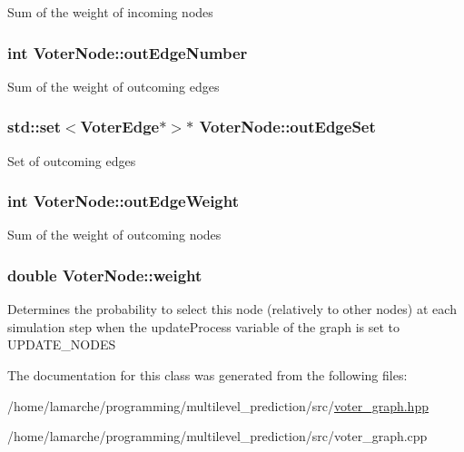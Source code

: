Sum of the weight of incoming nodes \hypertarget{class_voter_node_ad02a5823353dd4f1e0a1b9965553a1ef}{
\subsubsection[{out\-Edge\-Number}]{\setlength{\rightskip}{0pt plus 5cm}int Voter\-Node\-::out\-Edge\-Number}}\label{class_voter_node_ad02a5823353dd4f1e0a1b9965553a1ef}
Sum of the weight of outcoming edges \hypertarget{class_voter_node_abbeb36b008f12217d080f9eb287ae9de}{
\subsubsection[{out\-Edge\-Set}]{\setlength{\rightskip}{0pt plus 5cm}std\-::set$<${\bf Voter\-Edge}$\ast$$>$$\ast$ Voter\-Node\-::out\-Edge\-Set}}\label{class_voter_node_abbeb36b008f12217d080f9eb287ae9de}
Set of outcoming edges \hypertarget{class_voter_node_ae092216c9048f14155b2e580236ab6a9}{
\subsubsection[{out\-Edge\-Weight}]{\setlength{\rightskip}{0pt plus 5cm}int Voter\-Node\-::out\-Edge\-Weight}}\label{class_voter_node_ae092216c9048f14155b2e580236ab6a9}
Sum of the weight of outcoming nodes \hypertarget{class_voter_node_a06aa43e2603a2c8ee7540c754ef1fce2}{
\subsubsection[{weight}]{\setlength{\rightskip}{0pt plus 5cm}double Voter\-Node\-::weight}}\label{class_voter_node_a06aa43e2603a2c8ee7540c754ef1fce2}
Determines the probability to select this node (relatively to other nodes) at each simulation step when the update\-Process variable of the graph is set to U\-P\-D\-A\-T\-E\-\_\-\-N\-O\-D\-E\-S 

The documentation for this class was generated from the following files\-:\begin{DoxyCompactItemize}
\item 
/home/lamarche/programming/multilevel\-\_\-prediction/src/\hyperlink{voter__graph_8hpp}{voter\-\_\-graph.\-hpp}\item 
/home/lamarche/programming/multilevel\-\_\-prediction/src/voter\-\_\-graph.\-cpp\end{DoxyCompactItemize}
